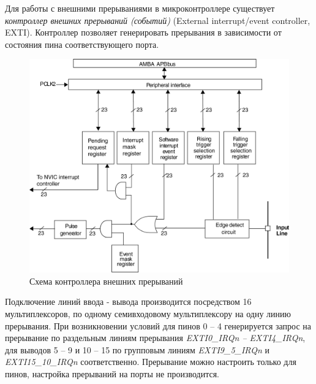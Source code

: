 Для работы с внешними прерываниями в микроконтроллере существует \textit{контроллер внешних прерываний (событий)} (External interrupt/event controller, EXTI). Контроллер позволяет генерировать прерывания в зависимости от состояния пина соответствующего порта.
\begin{figure}[h]
\begin{center}
\includegraphics[scale=0.15]{Image/65.jpg} 
\end{center}
\caption{Схема контроллера внешних прерываний}
\end{figure}
Подключение линий ввода - вывода производится посредством 16 мультиплексоров, по одному семивходовому мультиплексору на одну линию прерывания. При возникновении условий для пинов 0 -- 4 генерируется запрос на прерывание по раздельным линиям прерывания \textit{EXTI0\_IRQn -- EXTI4\_IRQn}, для выводов 5 -- 9 и 10 -- 15 по групповым линиям \textit{EXTI9\_5\_IRQn} и \textit{EXTI15\_10\_IRQn} соответственно. Прерывание можно настроить только для пинов, настройка прерываний на порты не производится.

